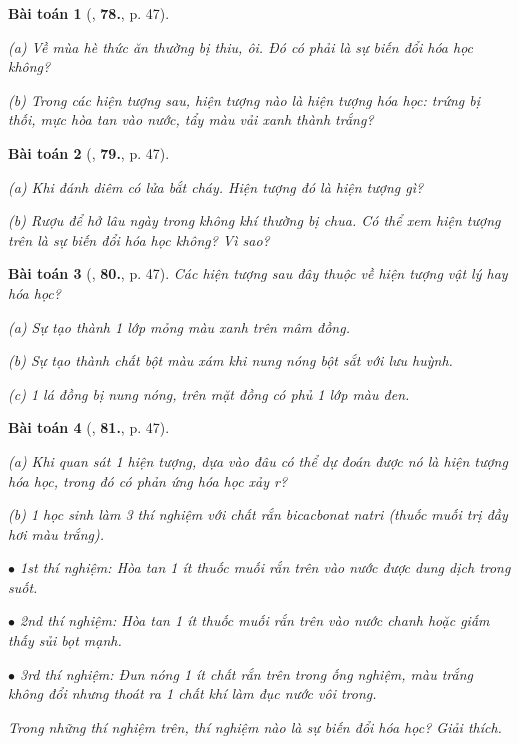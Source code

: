 \documentclass{article}
\numberwithin{equation}{section}
\newtheorem{baitoan}{Bài toán}
\begin{document}
\begin{baitoan}[\cite{An_400_BT_Hoa_Hoc_8_2020}, \textbf{78.}, p. 47]
	\begin{enumerate*}
		\item[(a)] Về mùa hè thức ăn thường bị thiu, ôi. Đó có phải là sự biến đổi hóa học không?
		\item[(b)] Trong các hiện tượng sau, hiện tượng nào là hiện tượng hóa học: trứng bị thối, mực hòa tan vào nước, tẩy màu vải xanh thành trắng?
	\end{enumerate*}
\end{baitoan}

\begin{baitoan}[\cite{An_400_BT_Hoa_Hoc_8_2020}, \textbf{79.}, p. 47]
\begin{enumerate*}
	\item[(a)] Khi đánh diêm có lửa bắt cháy. Hiện tượng đó là hiện tượng gì?
	\item[(b)] Rượu để hở lâu ngày trong không khí thường bị chua. Có thể xem hiện tượng trên là sự biến đổi hóa học không? Vì sao?
	\end{enumerate*}
\end{baitoan}

\begin{baitoan}[\cite{An_400_BT_Hoa_Hoc_8_2020}, \textbf{80.}, p. 47]
	Các hiện tượng sau đây thuộc về hiện tượng vật lý hay hóa học?
	\begin{enumerate*}
		\item[(a)] Sự tạo thành 1 lớp mỏng màu xanh trên mâm đồng.
		\item[(b)] Sự tạo thành chất bột màu xám khi nung nóng bột sắt với lưu huỳnh.
		\item[(c)] 1 lá đồng bị nung nóng, trên mặt đồng có phủ 1 lớp màu đen.
	\end{enumerate*}
\end{baitoan}

\begin{baitoan}[\cite{An_400_BT_Hoa_Hoc_8_2020}, \textbf{81.}, p. 47]
	\begin{enumerate*}
		\item[(a)] Khi quan sát 1 hiện tượng, dựa vào đâu có thể dự đoán được nó là hiện tượng hóa học, trong đó có phản ứng hóa học xảy r?
		\item[(b)] 1 học sinh làm 3 thí nghiệm với chất rắn bicacbonat natri \emph{} (thuốc muối trị đầy hơi màu trắng).
		\begin{enumerate*}
			\item[$\bullet$] 1st thí nghiệm: Hòa tan 1 ít thuốc muối rắn trên vào nước được dung dịch trong suốt.
			\item[$\bullet$] 2nd thí nghiệm: Hòa tan 1 ít thuốc muối rắn trên vào nước chanh hoặc giấm thấy sủi bọt mạnh.
			\item[$\bullet$] 3rd thí nghiệm: Đun nóng 1 ít chất rắn trên trong ống nghiệm, màu trắng không đổi nhưng thoát ra 1 chất khí làm đục nước vôi trong.
		\end{enumerate*}
		Trong những thí nghiệm trên, thí nghiệm nào là sự biến đổi hóa học? Giải thích.
	\end{enumerate*}
\end{baitoan}
\end{document}
